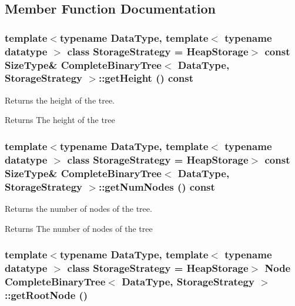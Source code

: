 \subsection{Member Function Documentation}
\hypertarget{class_complete_binary_tree_a2b51ae89ab242c2ce7de8ec90b963b34}{
\subsubsection[{getHeight}]{\setlength{\rightskip}{0pt plus 5cm}template$<$typename DataType, template$<$ typename datatype $>$ class StorageStrategy = HeapStorage$>$ const SizeType\& {\bf CompleteBinaryTree}$<$ DataType, StorageStrategy $>$::getHeight () const}}
\label{class_complete_binary_tree_a2b51ae89ab242c2ce7de8ec90b963b34}


Returns the height of the tree. 

\begin{DoxyReturn}{Returns}
The height of the tree 
\end{DoxyReturn}
\hypertarget{class_complete_binary_tree_a017457f2cc1b4fe7d6ffd8f9df4d2166}{
\subsubsection[{getNumNodes}]{\setlength{\rightskip}{0pt plus 5cm}template$<$typename DataType, template$<$ typename datatype $>$ class StorageStrategy = HeapStorage$>$ const SizeType\& {\bf CompleteBinaryTree}$<$ DataType, StorageStrategy $>$::getNumNodes () const}}
\label{class_complete_binary_tree_a017457f2cc1b4fe7d6ffd8f9df4d2166}


Returns the number of nodes of the tree. 

\begin{DoxyReturn}{Returns}
The number of nodes of the tree 
\end{DoxyReturn}
\hypertarget{class_complete_binary_tree_a6238107a4a2cd42daf790d3350c30bf6}{
\subsubsection[{getRootNode}]{\setlength{\rightskip}{0pt plus 5cm}template$<$typename DataType, template$<$ typename datatype $>$ class StorageStrategy = HeapStorage$>$ {\bf Node} {\bf CompleteBinaryTree}$<$ DataType, StorageStrategy $>$::getRootNode ()}}
\label{class_complete_binary_tree_a6238107a4a2cd42daf790d3350c30bf6}


